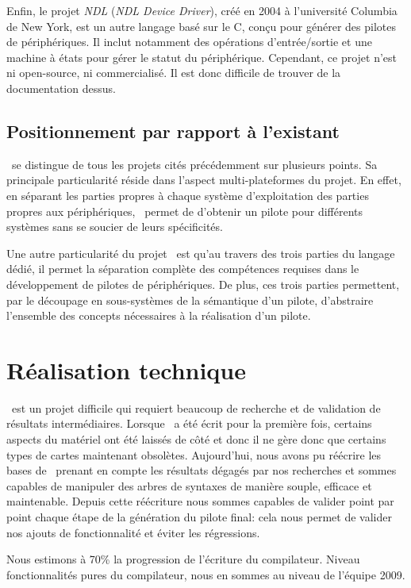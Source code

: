 \documentclass[francais]{rtxreport}
\begin{document}
Enfin, le projet \emph{NDL} (\emph{NDL Device Driver}), créé en 2004 à
l'université Columbia de New York, est un autre langage basé sur le C, conçu
pour générer des pilotes de périphériques. Il inclut notamment des opérations
d'entrée/sortie et une machine à états pour gérer le statut du
périphérique. Cependant, ce projet n'est ni open-source, ni commercialisé. Il
est donc difficile de trouver de la documentation dessus.

\section{Positionnement par rapport à l'existant}
\rtx\ se distingue de tous les projets cités précédemment sur plusieurs
points. Sa principale particularité réside dans l'aspect multi-plateformes du
projet. En effet, en séparant les parties propres à chaque système
d'exploitation des parties propres aux périphériques, \rtx\ permet de d'obtenir
un pilote pour différents systèmes sans se soucier de leurs spécificités.

Une autre particularité du projet \rtx\ est qu'au travers des trois parties du
langage dédié, il permet la séparation complète des compétences requises dans le
développement de pilotes de périphériques. De plus, ces trois parties
permettent, par le découpage en sous-systèmes de la sémantique d'un pilote,
d'abstraire l'ensemble des concepts nécessaires à la réalisation d'un pilote.

\chapter{Réalisation technique}

\rtx\ est un projet difficile qui requiert beaucoup de recherche et de
validation de résultats intermédiaires. Lorsque \rtx\ a été écrit pour la
première fois, certains aspects du matériel ont été laissés de côté et donc il
ne gère donc que certains types de cartes maintenant obsolètes. Aujourd'hui,
nous avons pu réécrire les bases de \rtx\ prenant en compte les résultats
dégagés par nos recherches et sommes capables de manipuler des arbres de
syntaxes de manière souple, efficace et maintenable. Depuis cette réécriture
nous sommes capables de valider point par point chaque étape de la génération du
pilote final: cela nous permet de valider nos ajouts de fonctionnalité et éviter
les régressions.

Nous estimons à 70\% la progression de l’écriture du compilateur. Niveau
fonctionnalités pures du compilateur, nous en sommes au niveau de l'équipe 2009.
\end{document}
